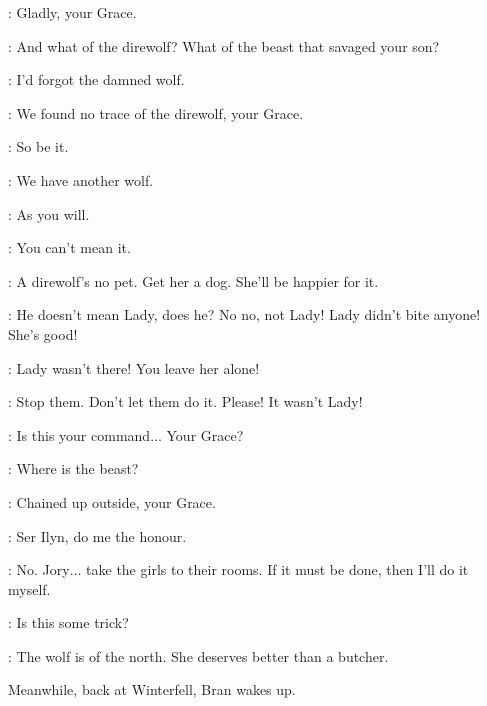 \NED: Gladly, your Grace. 

\CERSEI: And what of the direwolf? What of the beast that savaged your son? 

\ROBERT: I'd forgot the damned wolf. 

\SOLDIERa: We found no trace of the direwolf, your Grace. 

\ROBERT: So be it. 

\CERSEI: We have another wolf. 

\ROBERT: As you will. 

\NED: You can't mean it. 

\ROBERT: A direwolf's no pet. Get her a dog. She'll be happier for it.

\SANSA: He doesn't mean Lady, does he? No no, not Lady! Lady didn't bite anyone! She's good! 

\ARYA: Lady wasn't there! You leave her alone! 

\SANSA: Stop them. Don't let them do it. Please! It wasn't Lady! 

\NED: Is this your command$\ldots$ Your Grace? 

\CERSEI: Where is the beast? 

\SOLDIERa: Chained up outside, your Grace. 

\CERSEI: Ser Ilyn, do me the honour. 

\NED: No. Jory$\ldots$ take the girls to their rooms. If it must be done, then I'll do it myself. 

\CERSEI: Is this some trick? 

\NED: The wolf is of the north. She deserves better than a butcher.


\scene

\n Meanwhile, back at Winterfell, Bran wakes up.


